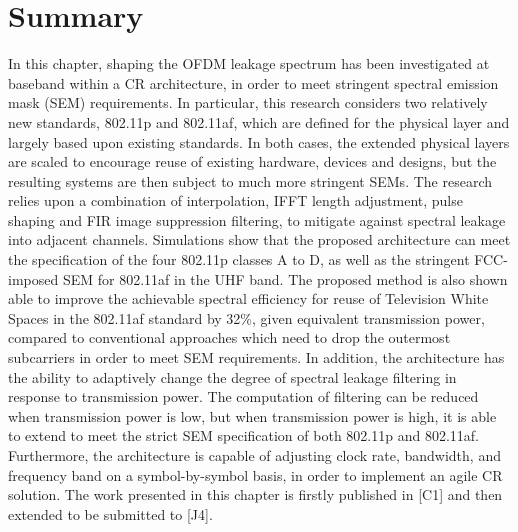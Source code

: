 \section{Summary}
In this chapter, shaping the OFDM leakage spectrum has been investigated at baseband within a CR architecture, in order to meet stringent spectral emission mask (SEM) requirements. 
In particular, this research considers two relatively new standards, 802.11p and 802.11af, which are defined for the physical layer and largely based upon existing standards. 
In both cases, the extended physical layers are scaled to encourage reuse of existing hardware, devices and designs, but the resulting systems are then subject to much more stringent SEMs.
The research relies upon a combination of interpolation, IFFT length adjustment, pulse shaping and FIR image suppression filtering, to mitigate against spectral leakage into adjacent channels. 
Simulations show that the proposed architecture can meet the specification of the four 802.11p classes A to D, as well as the stringent FCC-imposed SEM for 802.11af in the UHF
band.
The proposed method is also shown able to improve the achievable spectral efficiency for reuse of Television White Spaces in the 802.11af standard by 32\%, given equivalent transmission power, compared to conventional approaches which need to drop the outermost subcarriers in order to meet SEM requirements.
In addition, the architecture has the ability to adaptively change the degree of spectral leakage filtering in response to transmission power.
The computation of filtering can be reduced when transmission power is low, but when transmission power is high, it is able to extend to meet the strict SEM specification of both 802.11p and 802.11af. 
Furthermore, the architecture is capable of adjusting clock rate, bandwidth, and frequency band on a symbol-by-symbol basis, in order to implement an agile CR solution.
The work presented in this chapter is firstly published in [C1] and then extended to be submitted to [J4].